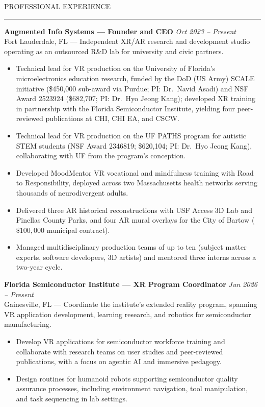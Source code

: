 \documentclass{resume} %
\renewenvironment{rSection}[1]{
  \needspace{4\baselineskip}
  \sectionskip
  \textcolor{CustomRed}{\MakeUppercase{#1}}
  \sectionlineskip
  \hrule
  \begin{list}{}{
    \setlength{\leftmargin}{1.5em}
  }
  \item[]
}{
  \end{list}
}
\begin{document}
\begin{rSection}{Professional Experience}
\textbf{Augmented Info Systems --- Founder and CEO} \hfill \emph{Oct 2023 -- Present}\\
Fort Lauderdale, FL --- Independent XR/AR research and development studio operating as an outsourced R\&D lab for university and civic partners.
\begin{itemize}
\itemsep -0.5em \vspace{-0.5em}
\item Technical lead for VR production on the University of Florida's microelectronics education research, funded by the DoD (US Army) SCALE initiative (\$450,000 sub-award via Purdue; PI: Dr.\ Navid Asadi) and NSF Award 2523924 (\$682,707; PI: Dr.\ Hyo Jeong Kang); developed XR training in partnership with the Florida Semiconductor Institute, yielding four peer-reviewed publications at CHI, CHI EA, and CSCW.
\item Technical lead for VR production on the UF PATHS program for autistic STEM students (NSF Award 2346819; \$620,104; PI: Dr.\ Hyo Jeong Kang), collaborating with UF from the program's conception.
\item Developed MoodMentor VR vocational and mindfulness training with Road to Responsibility, deployed across two Massachusetts health networks serving thousands of neurodivergent adults.
\item Delivered three AR historical reconstructions with USF Access 3D Lab and Pinellas County Parks, and four AR mural overlays for the City of Bartow ($\$100{,}000$ municipal contract).
\item Managed multidisciplinary production teams of up to ten (subject matter experts, software developers, 3D artists) and mentored three interns across a two-year cycle.
\end{itemize}

\textbf{Florida Semiconductor Institute --- XR Program Coordinator} \hfill \emph{Jun 2026 -- Present}\\
Gainesville, FL --- Coordinate the institute's extended reality program, spanning VR application development, learning research, and robotics for semiconductor manufacturing.
\begin{itemize}
\itemsep -0.5em \vspace{-0.5em}
\item Develop VR applications for semiconductor workforce training and collaborate with research teams on user studies and peer-reviewed publications, with a focus on agentic AI and immersive pedagogy.
\item Design routines for humanoid robots supporting semiconductor quality assurance processes, including environment navigation, tool manipulation, and task sequencing in lab settings.
\end{itemize}


\end{rSection}
\end{document}
